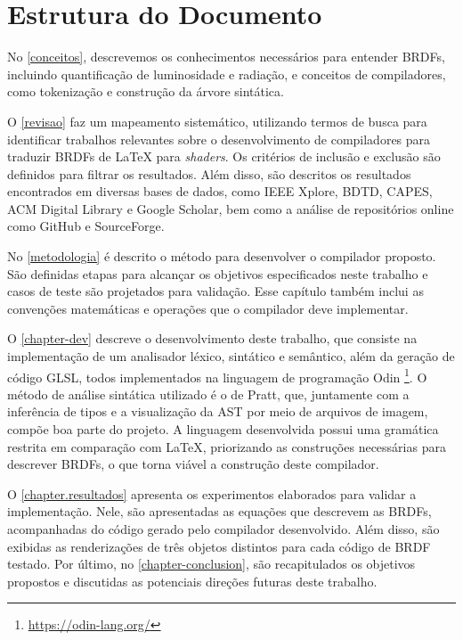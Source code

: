 \documentclass[english,
               brazil,
               bsc] %
               {dcomp-abntex2}
\begin{document}
\section{Estrutura do Documento}
No \autoref{conceitos}, descrevemos os conhecimentos necessários para entender BRDFs, incluindo quantificação de luminosidade e radiação, e  conceitos de compiladores, como tokenização e construção da árvore sintática.


O \autoref{revisao} faz um mapeamento sistemático, utilizando termos de busca para identificar trabalhos relevantes sobre o desenvolvimento de compiladores para traduzir BRDFs de \LaTeX{}  para \textit{shaders}. Os critérios de inclusão e exclusão são definidos para filtrar os resultados. Além disso, são descritos os resultados encontrados em diversas bases de dados, como IEEE Xplore, BDTD, CAPES, ACM Digital Library e Google Scholar, bem como a análise de repositórios online como GitHub e SourceForge.


No \autoref{metodologia} é descrito o método para desenvolver o compilador proposto. São definidas etapas para alcançar os objetivos especificados neste trabalho e casos de teste são projetados para validação. Esse capítulo também inclui as convenções matemáticas e operações que o compilador deve implementar.



O \autoref{chapter-dev} descreve o desenvolvimento deste trabalho, que consiste na implementação de um analisador léxico, sintático e semântico, além da geração de código GLSL, todos implementados na linguagem de programação Odin \footnote{\url{https://odin-lang.org/}}. O método de análise sintática utilizado é o de Pratt, que, juntamente com a inferência de tipos e a visualização da AST por meio de arquivos de imagem, compõe boa parte do projeto. A linguagem desenvolvida possui uma gramática restrita em comparação com \LaTeX{}, priorizando as construções necessárias para descrever BRDFs, o que torna viável a construção deste compilador.

O \autoref{chapter.resultados} apresenta os experimentos elaborados para validar a implementação. Nele, são apresentadas as equações que descrevem as BRDFs, acompanhadas do código gerado pelo compilador desenvolvido. Além disso, são exibidas as renderizações de três objetos distintos para cada código de BRDF testado. Por último, no \autoref{chapter-conclusion}, são recapitulados os objetivos propostos e discutidas as potenciais direções futuras deste trabalho.
\end{document}
